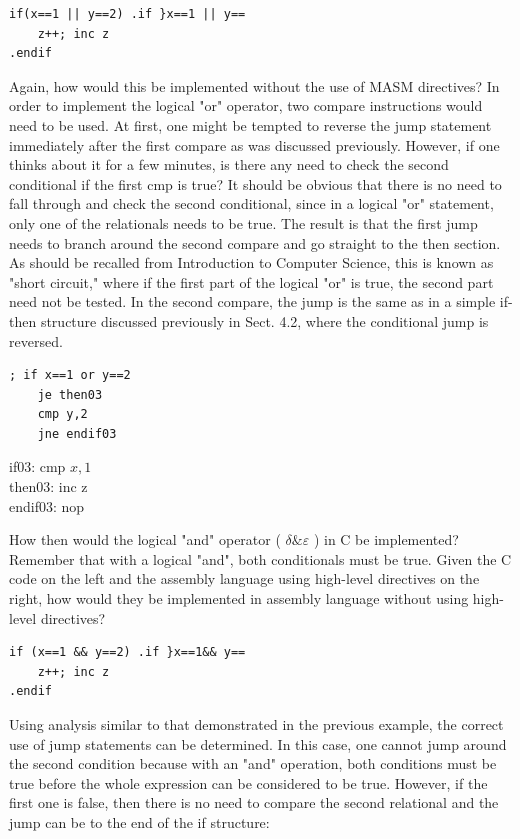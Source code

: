 \documentclass[10pt]{article}
\begin{document}
\begin{verbatim}
if(x==1 || y==2) .if }x==1 || y==
    z++; inc z
.endif
\end{verbatim}

Again, how would this be implemented without the use of MASM directives? In order to implement the logical "or" operator, two compare instructions would need to be used. At first, one might be tempted to reverse the jump statement immediately after the first compare as was discussed previously. However, if one thinks about it for a few minutes, is there any need to check the second conditional if the first cmp is true? It should be obvious that there is no need to fall through and check the second conditional, since in a logical "or" statement, only one of the relationals needs to be true. The result is that the first jump needs to branch around the second compare and go straight to the then section. As should be recalled from Introduction to Computer Science, this is known as "short circuit," where if the first part of the logical "or" is true, the second part need not be tested. In the second compare, the jump is the same as in a simple if-then structure discussed previously in Sect. 4.2, where the conditional jump is reversed.

\begin{verbatim}
; if x==1 or y==2
    je then03
    cmp y,2
    jne endif03
\end{verbatim}

if03: cmp $x, 1$\\
then03: inc z\\
endif03: nop

How then would the logical "and" operator ( $\delta \& \varepsilon$ ) in C be implemented? Remember that with a logical "and", both conditionals must be true. Given the C code on the left and the assembly language using high-level directives on the right, how would they be implemented in assembly language without using high-level directives?

\begin{verbatim}
if (x==1 && y==2) .if }x==1&& y==
    z++; inc z
.endif
\end{verbatim}

Using analysis similar to that demonstrated in the previous example, the correct use of jump statements can be determined. In this case, one cannot jump around the second condition because with an "and" operation, both conditions must be true before the whole expression can be considered to be true. However, if the first one is false, then there is no need to compare the second relational and the jump can be to the end of the if structure:
\end{document}
